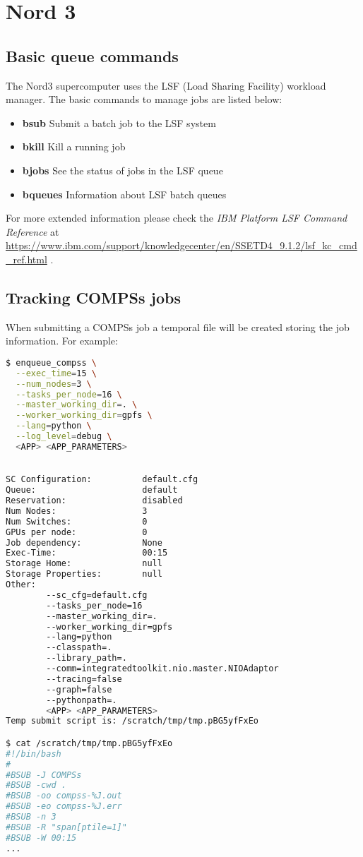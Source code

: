 \section{Nord 3}
\label{sec:nord3}


\subsection{Basic queue commands}

The Nord3 supercomputer uses the LSF (Load Sharing Facility) workload manager. The basic commands to manage jobs are listed below:
\begin{itemize}
 \item \textbf{bsub} Submit a batch job to the LSF system
 \item \textbf{bkill} Kill a running job 
 \item \textbf{bjobs} See the status of jobs in the LSF queue
 \item \textbf{bqueues} Information about LSF batch queues
\end{itemize}

For more extended information please check the \textit{IBM Platform LSF Command Reference} at 
\url{https://www.ibm.com/support/knowledgecenter/en/SSETD4_9.1.2/lsf_kc_cmd_ref.html} .


\subsection{Tracking COMPSs jobs}

When submitting a COMPSs job a temporal file will be created storing the job information. For example:

\begin{lstlisting}[language=bash]
$ enqueue_compss \
  --exec_time=15 \
  --num_nodes=3 \
  --tasks_per_node=16 \
  --master_working_dir=. \
  --worker_working_dir=gpfs \
  --lang=python \
  --log_level=debug \
  <APP> <APP_PARAMETERS>

  
SC Configuration:          default.cfg
Queue:                     default
Reservation:               disabled
Num Nodes:                 3
Num Switches:              0
GPUs per node:             0
Job dependency:            None
Exec-Time:                 00:15
Storage Home:              null
Storage Properties:        null
Other:                     
        --sc_cfg=default.cfg
        --tasks_per_node=16
        --master_working_dir=.
        --worker_working_dir=gpfs
        --lang=python
        --classpath=.
        --library_path=.
        --comm=integratedtoolkit.nio.master.NIOAdaptor
        --tracing=false
        --graph=false
        --pythonpath=.
        <APP> <APP_PARAMETERS>
Temp submit script is: /scratch/tmp/tmp.pBG5yfFxEo

$ cat /scratch/tmp/tmp.pBG5yfFxEo
#!/bin/bash
#
#BSUB -J COMPSs
#BSUB -cwd . 
#BSUB -oo compss-%J.out
#BSUB -eo compss-%J.err
#BSUB -n 3
#BSUB -R "span[ptile=1]"
#BSUB -W 00:15 
...
\end{lstlisting}


